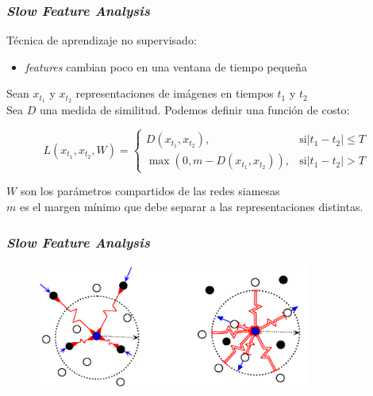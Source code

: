 \documentclass{beamer}
\begin{document}
\begin{frame}
\frametitle{\textit{Slow Feature Analysis}}

Técnica de aprendizaje no supervisado:
\begin{itemize}
    \item \textit{features} cambian poco en una ventana de tiempo pequeña \pause
	\end{itemize}

	Sean \(x_{t_1}\) y \(x_{t_2}\) representaciones de imágenes en tiempos \(t_1\) y \(t_2\)\\
Sea \(D\) una medida de similitud. Podemos definir una función de costo:

\begin{equation}
L(x_{t_1}, x_{t_2}, W) = \begin{cases}
                           D(x_{t_1}, x_{t_2}),& \text{si} |t_1 - t_2| \leq T \\ 
                           \max{(0, m - D(x_{t_1}, x_{t_2}))},& \text{si} |t_1 - t_2| > T
                         \end{cases}
\end{equation}

\(W\) son los parámetros compartidos de las redes siamesas\\
\(m\) es el margen mínimo que debe separar a las representaciones distintas.
\end{frame}


\begin{frame}
\frametitle{\textit{Slow Feature Analysis}}
\begin{figure}
    \centering
    \includegraphics[width=0.8\textwidth]{images/example_contrastiveloss.png}
\end{figure}
\end{frame}
\end{document}
